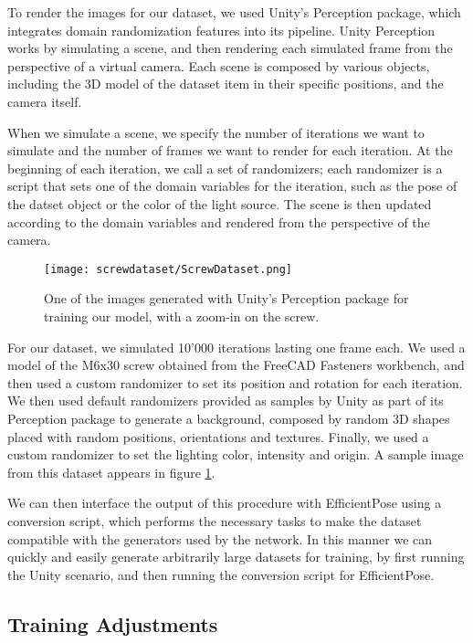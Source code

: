 To render the images for our dataset, we used Unity's Perception package\cite{unityPerception}, which integrates domain randomization features into its pipeline. Unity Perception works by simulating a scene, and then rendering each simulated frame from the perspective of a virtual camera. Each scene is composed by various objects, including the 3D model of the dataset item in their specific positions, and the camera itself. 

When we simulate a scene, we specify the number of iterations we want to simulate and the number of frames we want to render for each iteration. At the beginning of each iteration, we call a set of randomizers; each randomizer is a script that sets one of the domain variables for the iteration, such as the pose of the datset object or the color of the light source. The scene is then updated according to the domain variables and rendered from the perspective of the camera.

\begin{figure}
    \centering
    \texttt{[image: screwdataset/ScrewDataset.png]}
    \caption{One of the images generated with Unity's Perception package for training our model, with a zoom-in on the screw.}
    \label{fig:screwdataset}
\end{figure}

For our dataset, we simulated 10'000 iterations lasting one frame each. We used a model of the M6x30 screw obtained from the FreeCAD Fasteners workbench\cite{Fasteners}, and then used a custom randomizer to set its position and rotation for each iteration. We then used default randomizers provided as samples by Unity as part of its Perception package to generate a background, composed by random 3D shapes placed with random positions, orientations and textures. Finally, we used a custom randomizer to set the lighting color, intensity and origin. A sample image from this dataset appears in figure \ref{fig:screwdataset}.

We can then interface the output of this procedure with EfficientPose using a conversion script, which performs the necessary tasks to make the dataset compatible with the generators used by the network. In this manner we can quickly and easily generate arbitrarily large datasets for training, by first running the Unity scenario, and then running the conversion script for EfficientPose.

\subsection{Training Adjustments}


